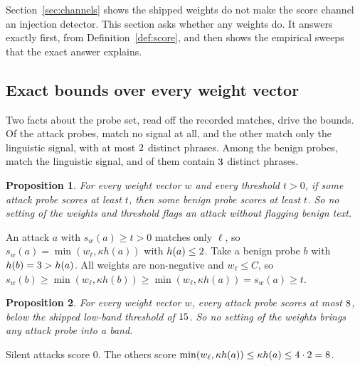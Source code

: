 \documentclass[conference]{IEEEtran}
\newtheorem{proposition}{Proposition}
\begin{document}
Section~\ref{sec:channels} shows the shipped weights do not make the score
channel an injection detector. This section asks whether any weights do. It
answers exactly first, from Definition~\ref{def:score}, and then shows the
empirical sweeps that the exact answer explains.

\subsection{Exact bounds over every weight vector}\label{sec:bounds}

Two facts about the probe set, read off the recorded matches, drive the
bounds. Of the \NBoundAttack{} attack probes, \NBoundAttackSilent{} match no
signal at all, and the other \NBoundAttackLing{} match only the linguistic
signal, with at most $2{}$ distinct phrases. Among the benign
probes, \NBoundBenignLing{} match the linguistic signal, and
\NBoundBenignMaxHits{} of them contain $3{}$ distinct phrases.

\begin{proposition}\label{prop:zerofp}
For every weight vector $w$ and every threshold $t > 0$, if some attack probe
scores at least $t$, then some benign probe scores at least $t$. So no setting
of the weights and threshold flags an attack without flagging benign text.
\end{proposition}
\begin{IEEEproof}
An attack $a$ with $s_w(a) \ge t > 0$ matches only $\ell$, so
$s_w(a) = \min(w_\ell, \kappa h(a))$ with $h(a) \le 2{}$. Take
a benign probe $b$ with $h(b) = 3{} > h(a)$. All weights are
non-negative and $w_\ell \le C$, so $s_w(b) \ge \min(w_\ell, \kappa h(b)) \ge
\min(w_\ell, \kappa h(a)) = s_w(a) \ge t$.
\end{IEEEproof}

\begin{proposition}\label{prop:band}
For every weight vector $w$, every attack probe scores at most
$8{}$, below the shipped low-band threshold of
$15{}$. So no setting of the weights brings any attack probe into a
band.
\end{proposition}
\begin{IEEEproof}
Silent attacks score $0$. The others score $\min(w_\ell, \kappa h(a)) \le
\kappa h(a) \le 4{} \cdot 2{} =
8{}$.
\end{IEEEproof}
\end{document}
